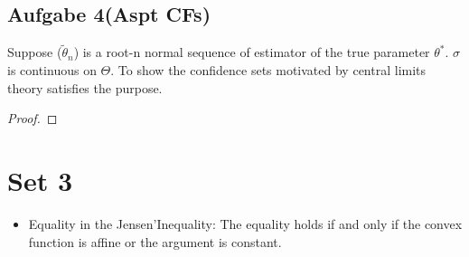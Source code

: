 \documentclass[a4paper,11pt]{article}
\theoremstyle{definition}
\theoremstyle{remark}
\begin{document}
\subsection*{Aufgabe 4(Aspt CFs)}
Suppose ($\tilde{\theta}_n$) is a root-n normal sequence of estimator of the true parameter $\theta^*$. $\sigma$ is continuous on $\Theta$. To show the confidence sets motivated by central limits theory satisfies the purpose.
\begin{proof}
	
\end{proof}


\section*{Set 3}
\begin{itemize}
\color{red}
\item Equality in the Jensen'Inequality: The equality holds if and only if the convex function is affine or the argument is constant.
\end{itemize}
\end{document}
